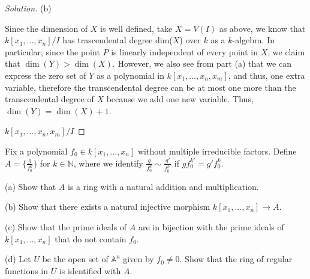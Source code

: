 \documentclass[10pt]{article}
\newenvironment{problem}[2][Problem]{\begin{trivlist}
\item[\hskip \labelsep {\bfseries #1}\hskip \labelsep {\bfseries #2.}]}{\end{trivlist}}
\begin{document}
\begin{proof}[Solution]
(b)

Since the dimension of $X$ is well defined, take $X = V(I)$ as above, we know that $k[x_1,...,x_n]/ I$ has trascendental degree dim($X$) over $k$ as a $k$-algebra. In particular, since the point $P$ is linearly independent of every point in $X$, we claim that $\dim(Y) > \dim(X)$. However, we also see from part (a) that we can express the zero set of $Y$ as a polynomial in $k[x_1,...,x_n,x_m]$, and thus, one extra variable, therefore the transcendental degree can be at most one more than the transcendental degree of $X$ because we add one new variable. Thus, $\dim(Y) = \dim(X) + 1$.

 $k[x_1,...,x_n,x_m]/ I$

\end{proof}

\begin{problem}{3.3}

Fix a polynomial $f_0 \in k[x_1,...,x_n]$ without multiple irreducible factors. Define $A = \{ \frac{g}{f_0^k} \}$ for $k \in \mathbb{N}$, where we identify $\frac{g}{f_0^k} \sim \frac{g'}{f_0^{k'}}$ if $gf_0^{k'} = g' f_0^k$.

(a) Show that $A$ is a ring with a natural addition and multiplication.

(b) Show that there exists a natural injective morphism $k[x_1,...,x_n] \to A$.

(c) Show that the prime ideals of $A$ are in bijection with the prime ideals of $k[x_1,...,x_n]$ that do not contain $f_0$.

(d) Let $U$ be the open set of $\mathbb{A}^n$ given by $f_0 \not = 0$. Show that the ring of regular functions in $U$ is identified with $A$.

\end{problem}
\end{document}
